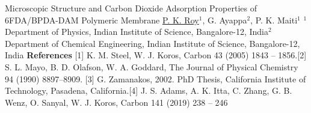 \begin{abstract_online}{Microscopic Structure and Carbon Dioxide Adsorption Properties of 6FDA/BPDA-DAM Polymeric Membrane}{%
        \underline{P. K. Roy}$^{1}$, G. Ayappa$^{2}$, P. K. Maiti$^{1}$}{%
        }{%
        $^1$ Department of Physics, Indian Institute of Science, Bangalore-12, India\newline{}$^2$ Department of Chemical Engineering, Indian Institute of Science, Bangalore-12, India}
        \textbf{References} \newline{}[1] K. M. Steel, W. J. Koros, Carbon 43 (2005) 1843 – 1856.\newline{}[2] S. L. Mayo, B. D. Olafson, W. A. Goddard, The Journal of Physical Chemistry 94 (1990) 8897–8909. \newline{}[3] G. Zamanakos, 2002. PhD Thesis, California Institute of Technology, Pasadena, California.\newline{}[4] J. S. Adams, A. K. Itta, C. Zhang, G. B. Wenz, O. Sanyal, W. J. Koros, Carbon 141 (2019) 238 – 246 
    \end{abstract_online}
    